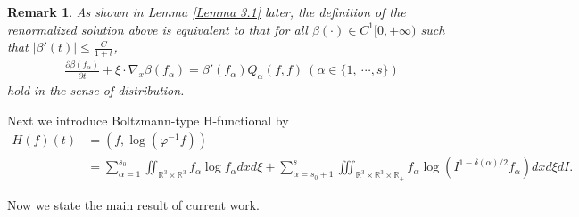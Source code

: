 \documentclass[reqno,11pt]{amsart}
\newtheorem{remark}{Remark}[section]
\numberwithin{equation}{section}
\def\R{\mathbb{R}}
\begin{document}
\begin{remark}
  As shown in Lemma \ref{Lemma 3.1} later, the definition of the renormalized solution above is equivalent to that for all $\beta (\cdot) \in C^1 [0, + \infty )$ such that $|\beta' (t)| \leq \tfrac{C}{1 + t}$,
  \begin{equation*}
    \begin{aligned}
      \tfrac{\partial \beta (f_\alpha)}{\partial t} + \xi \cdot \nabla_x \beta (f_\alpha) = \beta' (f_\alpha) Q_\alpha (f,f) \ (\alpha \in \{ 1,\
       \cdots, s \})
    \end{aligned}
  \end{equation*}
  hold in the sense of distribution.
\end{remark}


Next we introduce Boltzmann-type H-functional by
\begin{equation}\label{Hf}
	\begin{aligned}
		H(f)(t)& = (f,\log (\varphi^{-1} f) ) \\
		&=\sum \limits_{\alpha=1}^{s_0} \iint_{\R^3 \times \R^3 } f_\alpha \log f_\alpha  dxd\xi + \sum \limits_{\alpha = s_0+1}^{s}\iiint_{\R^3 \times \R^3 \times \R_+ } f_\alpha \log (I^{1-\delta(\alpha)/2} f_\alpha ) dxd\xi dI.
	\end{aligned}
\end{equation}


Now we state the main result of current work.
\end{document}
